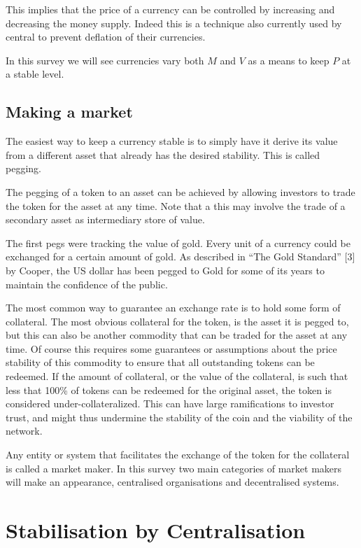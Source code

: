 \documentclass[english,]{IEEEtran}
\begin{document}
This implies that the price of a currency can be controlled by
increasing and decreasing the money supply. Indeed this is a technique
also currently used by central to prevent deflation of their currencies.

In this survey we will see currencies vary both \(M\) and \(V\) as a
means to keep \(P\) at a stable level.

\subsection{Making a market}\label{making-a-market}

The easiest way to keep a currency stable is to simply have it derive
its value from a different asset that already has the desired stability.
This is called pegging.

The pegging of a token to an asset can be achieved by allowing investors
to trade the token for the asset at any time. Note that a this may
involve the trade of a secondary asset as intermediary store of value.

The first pegs were tracking the value of gold. Every unit of a currency
could be exchanged for a certain amount of gold. As described in ``The
Gold Standard'' {[}3{]} by Cooper, the US dollar has been pegged to Gold
for some of its years to maintain the confidence of the public.

The most common way to guarantee an exchange rate is to hold some form
of collateral. The most obvious collateral for the token, is the asset
it is pegged to, but this can also be another commodity that can be
traded for the asset at any time. Of course this requires some
guarantees or assumptions about the price stability of this commodity to
ensure that all outstanding tokens can be redeemed. If the amount of
collateral, or the value of the collateral, is such that less that 100\%
of tokens can be redeemed for the original asset, the token is
considered under-collateralized. This can have large ramifications to
investor trust, and might thus undermine the stability of the coin and
the viability of the network.

Any entity or system that facilitates the exchange of the token for the
collateral is called a market maker. In this survey two main categories
of market makers will make an appearance, centralised organisations and
decentralised systems.

\section{Stabilisation by
Centralisation}\label{stabilisation-by-centralisation}
\end{document}
